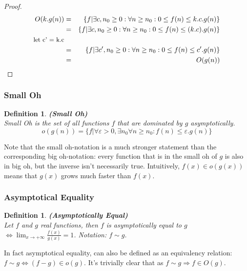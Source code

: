 \documentclass[a4paper,11pt]{report}
\newtheorem{definition}[theorem]{Definition}
\begin{document}
\begin{proof}
\begin{eqnarray*}
O(k.g(n)) &=& \{f|\exists c, n_0 \geq 0: \forall n \geq n_0 : 0 \leq f(n) \leq k.c.g(n)\}\\
&=& \{f|\exists c, n_0 \geq 0: \forall n \geq n_0 : 0 \leq f(n) \leq (k.c).g(n)\}\\
\text{\small{let c' = k.c}}\\
&=& \{f|\exists c', n_0 \geq 0: \forall n \geq n_0 : 0 \leq f(n) \leq c'.g(n)\}\\
&=& O(g(n))
\end{eqnarray*}
\end{proof}



\subsubsection{Small Oh}
\begin{definition}\textbf{(Small Oh)}\\
Small Oh is the set of all functions $f$ that are dominated by $g$ asymptotically.
$$o(g(n)) = \{f|\forall \varepsilon > 0, \exists n_0 \forall n \geq n_0: f(n) \leq \varepsilon.g(n)\}$$
\end{definition}
Note that the small oh-notation is a much stronger statement than the corresponding big oh-notation: every function that is in the small oh of $g$ is also in big oh, but the inverse isn't necessarily true. Intuitively, $f(x) \in o(g(x))$ means that $g(x)$ grows much faster than $f(x)$.

\subsubsection{Asymptotical Equality}
\begin{definition}\textbf{(Asymptotically Equal)}\\
Let $f$ and $g$ real functions, then $f$ is asymptotically equal to $g$ $\Leftrightarrow \displaystyle\lim_{x\rightarrow +\infty} \frac{f(x)}{g(x)}=1$. Notation: $f \sim g$.
\end{definition}
In fact asymptotical equality, can also be defined as an equivalency relation: $f\sim g \Leftrightarrow (f-g) \in o(g)$. It's trivially clear that as $f\sim g \Rightarrow f \in O(g)$.
\end{document}
